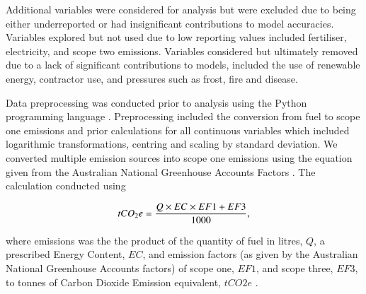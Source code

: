 \documentclass[review,12pt,authoryear]{elsarticle}
\begin{document}
\begin{linenumbers}
\par
Additional variables were considered for analysis but were excluded due to being either underreported or had insignificant contributions to model accuracies. Variables explored but not used due to low reporting values included fertiliser, electricity, and scope two emissions. Variables considered but ultimately removed due to a lack of significant contributions to models, included the use of renewable energy, contractor use, and pressures such as frost, fire and disease.
\par
Data preprocessing was conducted prior to analysis using the Python programming language \citep{g.vanrossumPythonTutorialTechnical1995}. Preprocessing included the conversion from fuel to scope one emissions and prior calculations for all continuous variables which included logarithmic transformations, centring and scaling by standard deviation. 
We converted multiple emission sources into scope one emissions using the equation given from the Australian National Greenhouse Accounts Factors \citep{agdeeNationalGreenhouseAccounts2021}. The calculation conducted using
\par
\begin{equation}
\label{(1)}
    tCO_{2}e={{Q \times EC \times EF1 + EF3}\over{1000}},
\end{equation}
\par
where emissions was the the product of the quantity of fuel in litres, $Q$, a prescribed Energy Content, $EC$, and emission factors (as given by the Australian National Greenhouse Accounts factors) of scope one, $EF1$, and scope three, $EF3$, to tonnes of Carbon Dioxide Emission equivalent, $tCO2e$ \citep{departmentofclimatechangeenergytheenvironmentandwaterAustralianNationalGreenhouse2022}.
\par
\begin{figure}

\end{figure}
\end{linenumbers}
\end{document}

